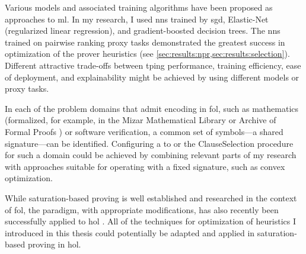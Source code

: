 

Various models and associated training algorithms have been proposed as approaches to \gls{ml}.
In my research, I used \glspl{nn} trained by \acrlong{sgd}, Elastic-Net (regularized linear regression), and gradient-boosted decision trees.
The \glspl{nn} trained on pairwise ranking proxy tasks demonstrated the greatest success in optimization of the prover heuristics (see \cref{sec:results:npr,sec:results:selection}).
Different attractive trade-offs between \gls{tping} performance, training efficiency, ease of deployment, and explainability might be achieved by using different models or proxy tasks.

In each of the problem domains that admit encoding in \gls{fol},
such as mathematics (formalized, for example, in the Mizar Mathematical Library \cite{DBLP:journals/jfrea/GrabowskiKN10,DBLP:journals/jar/Urban06} or Archive of Formal Proofs \cite{DBLP:conf/mkm/BlanchetteHMN15,DBLP:conf/itp/DesharnaisVBW22}) or software verification,
a common set of symbols---a shared signature---can be identified.
Configuring a \gls{to} or the \gls{ClauseSelection} procedure
for such a domain could be achieved by combining relevant parts of my research with approaches suitable for operating with a fixed signature, such as convex optimization.

While saturation-based proving is well established and researched in the context of \gls{fol},
the paradigm, with appropriate modifications, has also recently been successfully applied to \gls{hol} \cite{DBLP:journals/ki/Steen20,DBLP:journals/jar/VukmirovicBBCNT22,DBLP:conf/ijcar/BhayatS24}.
All of the techniques for optimization of heuristics I introduced in this thesis could potentially be adapted and applied in saturation-based proving in \gls{hol}.

